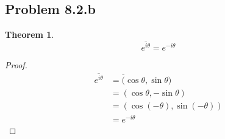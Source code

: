 \documentclass{article}
\newtheorem{theorem}[subsection]{Theorem}
\theoremstyle{definition}
\begin{document}
\subsection{Problem 8.2.b}
\begin{theorem}
\[ \overline{e^{i\theta}} = e^{-i\theta} \]
\end{theorem}
\begin{proof}
\begin{align*}
\overline{e^{i\theta}} 
&= \overline(\cos\theta,\sin\theta) \\
&= (\cos\theta,-\sin\theta) \\
&= (\cos(-\theta),\sin(-\theta)) \\
&= e^{-i\theta}
\end{align*}
\end{proof}
\end{document}
